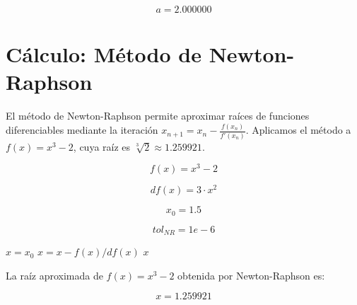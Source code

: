 \documentclass{article}
\begin{document}
\begin{equation}
    a = 
    2.000000
    \label{eq:res:a}
\end{equation}



\section{Cálculo: Método de Newton-Raphson}

El método de Newton-Raphson permite aproximar raíces de funciones diferenciables
mediante la iteración $x_{n+1} = x_n - \frac{f(x_n)}{f'(x_n)}$.
Aplicamos el método a $f(x) = x^3 - 2$, cuya raíz es $\sqrt[3]{2} \approx 1.259921$.

\begin{equation}
    f(x) = x^3 - 2
    \label{eq:calc:f}
\end{equation}

\begin{equation}
    df(x) = 3 \cdot x^2
    \label{eq:calc:df}
\end{equation}

\begin{equation}
    x_0 = 1.5
    \label{eq:calc:x0}
\end{equation}

\begin{equation}
    tol_{NR} = 1e-6
    \label{eq:calc:tolNR}
\end{equation}

\begin{algorithm}
\caption{Método de Newton-Raphson para $f(x) = x^3 - 2$}
\begin{algorithmic}
    \STATE $x = x_0$
        \STATE $x = x - f(x) / df(x)$
    \ENDWHILE
    \RETURN $x$
\end{algorithmic}
\end{algorithm}

La raíz aproximada de $f(x) = x^3 - 2$ obtenida por Newton-Raphson es:

\begin{equation}
    x =
    1.259921
    \label{eq:res:x}
\end{equation}

\end{document}
